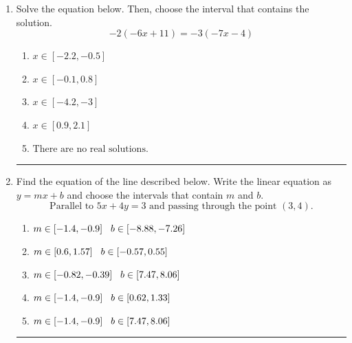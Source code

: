 \documentclass[14pt]{extbook}
\newcommand{\litem}[1]{\item#1\hspace*{-1cm}\rule{\textwidth}{0.4pt}}
\begin{document}
\begin{enumerate}
{\begin{enumerate}[label=\Alph*.]
\end{enumerate} }
\litem{
Solve the equation below. Then, choose the interval that contains the solution.\[ -2(-6x + 11) = -3(-7x -4) \]\begin{enumerate}[label=\Alph*.]
\item \( x \in [-2.2, -0.5] \)
\item \( x \in [-0.1, 0.8] \)
\item \( x \in [-4.2, -3] \)
\item \( x \in [0.9, 2.1] \)
\item \( \text{There are no real solutions.} \)

\end{enumerate} }
\litem{
Find the equation of the line described below. Write the linear equation as $ y=mx+b $ and choose the intervals that contain $m$ and $b$.\[ \text{Parallel to } 5 x + 4 y = 3 \text{ and passing through the point } (3, 4). \]\begin{enumerate}[label=\Alph*.]
\item \( m \in [-1.4, -0.9] \hspace*{3mm} b \in [-8.88, -7.26] \)
\item \( m \in [0.6, 1.57] \hspace*{3mm} b \in [-0.57, 0.55] \)
\item \( m \in [-0.82, -0.39] \hspace*{3mm} b \in [7.47, 8.06] \)
\item \( m \in [-1.4, -0.9] \hspace*{3mm} b \in [0.62, 1.33] \)
\item \( m \in [-1.4, -0.9] \hspace*{3mm} b \in [7.47, 8.06] \)


\end{enumerate}}
\end{enumerate}
\end{document}
